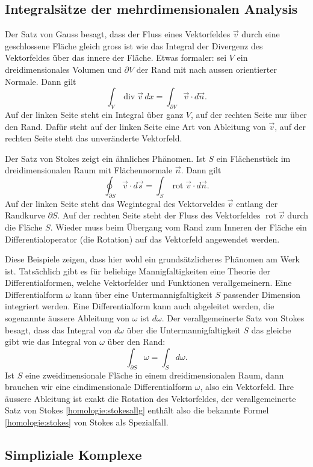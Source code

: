 \subsection{Integralsätze der mehrdimensionalen Analysis}
Der Satz von Gauss besagt, dass der Fluss eines Vektorfeldes $\vec v$
durch eine geschlossene Fläche gleich gross ist wie das Integral
der Divergenz des Vektorfeldes über das innere der Fläche.
Etwas formaler: sei $V$ ein dreidimensionales Volumen und $\partial V$
der Rand mit nach aussen orientierter Normale.
Dann gilt
\begin{equation}
\int_V\operatorname{div} \vec v\,dx
=
\int_{\partial V} \vec v\cdot d\vec n.
\label{homologie:gauss}
\end{equation}
Auf der linken Seite steht ein Integral über ganz $V$, auf der rechten
Seite nur über den Rand.
Dafür steht auf der linken Seite eine Art von Ableitung von $\vec v$,
auf der rechten Seite steht das unveränderte Vektorfeld.

Der Satz von Stokes zeigt ein ähnliches Phänomen.
Ist $S$ ein Flächenstück im dreidimensionalen Raum mit Flächennormale
$\vec n$.
Dann gilt
\[
\oint_{\partial S} \vec v\cdot d\vec s
=
\int_{S} \operatorname{rot}\vec v\cdot d\vec n.
\label{homologie:stokes}
\]
Auf der linken Seite steht das Wegintegral des Vektorveldes $\vec v$
entlang der Randkurve $\partial S$.
Auf der rechten Seite steht der Fluss des Vektorfeldes
$\operatorname{rot}\vec v$ durch die Fläche $S$.
Wieder muss beim Übergang vom Rand zum Inneren der Fläche ein
Differentialoperator (die Rotation) auf das Vektorfeld angewendet
werden.

Diese Beispiele zeigen, dass hier wohl ein grundsätzlicheres Phänomen
am Werk ist.
Tatsächlich gibt es für beliebige Mannigfaltigkeiten eine Theorie
der Differentialformen, welche Vektorfelder und Funktionen verallgemeinern.
Eine Differentialform $\omega$ kann über eine Untermannigfaltigkeit $S$
passender Dimension integriert werden.
Eine Differentialform kann auch abgeleitet werden, die sogenannte
äussere Ableitung von $\omega$ ist $d\omega$. 
Der verallgemeinerte Satz von Stokes besagt, dass das Integral von
$d\omega$ über die Untermannigfaltigkeit $S$ das gleiche gibt wie
das Integral von $\omega$ über den Rand:
\begin{equation}
\int_{\partial S}\omega = \int_{S}d\omega.
\label{homologie:stokesallg}
\end{equation}
Ist $S$ eine zweidimensionale Fläche in einem dreidimensionalen Raum,
dann brauchen wir eine eindimensionale Differentialform $\omega$,
also ein Vektorfeld.
Ihre äussere Ableitung ist exakt die Rotation des Vektorfeldes,
der verallgemeinerte Satz von Stokes \eqref{homologie:stokesallg}
enthält also die bekannte Formel \eqref{homologie:stokes} von Stokes
als Spezialfall.


\subsection{Simpliziale Komplexe}

